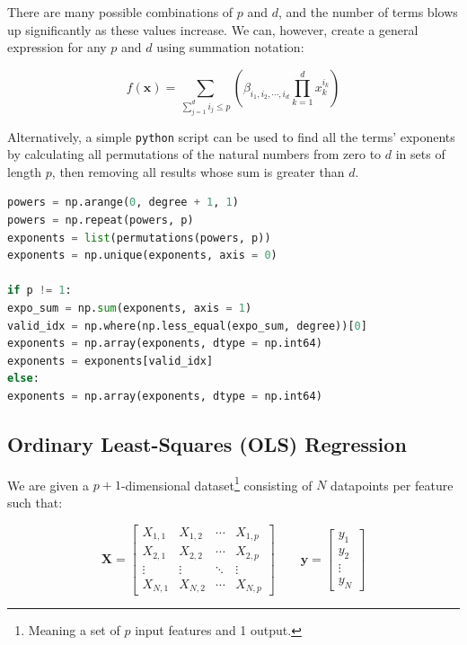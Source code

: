 \documentclass[a4paper,10pt,english]{article}
\begin{document}
There are many possible combinations of $p$ and $d$, and the number of terms blows up significantly as these values increase.  We can, however, create a general expression \cite{2482654} for any $p$ and $d$ using summation notation:

\begin{equation}
\label{eq_method_0}
f(\mathbf{x}) = \sum_{\sum_{j = 1}^d i_j \leq p} \left( \beta_{i_1, i_2, \cdots, i_d} \prod_{k = 1}^d x_k^{i_k} \right)
\end{equation}

Alternatively, a simple \texttt{python} script can be used to find all the terms' exponents by calculating all permutations of the natural numbers from zero to $d$ in sets of length $p$, then removing all results whose sum is greater than $d$.

\begin{lstlisting}[showstringspaces=false,language=Python,firstnumber = 1]
powers = np.arange(0, degree + 1, 1)
powers = np.repeat(powers, p)
exponents = list(permutations(powers, p))
exponents = np.unique(exponents, axis = 0)

if p != 1:
expo_sum = np.sum(exponents, axis = 1)
valid_idx = np.where(np.less_equal(expo_sum, degree))[0]
exponents = np.array(exponents, dtype = np.int64)
exponents = exponents[valid_idx]
else:
exponents = np.array(exponents, dtype = np.int64)
\end{lstlisting}


\subsection*{Ordinary Least-Squares (OLS) Regression}

We are given a $p+1$-dimensional dataset\footnote{Meaning a set of $p$ input features and 1 output.} consisting of $N$ datapoints per feature such that:

\begin{equation}
\label{eq_method_1}
\mathbf{X} = \begin{bmatrix} X_{1,1} & X_{1,2} & \cdots & X_{1,p} \\ X_{2,1} & X_{2,2} & \cdots & X_{2,p} \\ \vdots & \vdots & \ddots & \vdots \\ X_{N,1} & X_{N,2} & \cdots & X_{N,p} \end{bmatrix} \qquad \mathbf{y} = \begin{bmatrix} y_1 \\ y_2 \\ \vdots \\ y_N \end{bmatrix}
\end{equation}
\end{document}
